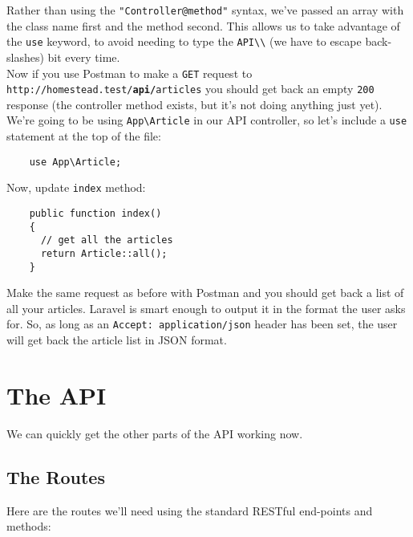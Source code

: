 Rather than using the \texttt{"Controller@method"} syntax, we've passed an array with the class name first and the method second. This allows us to take advantage of the \texttt{use} keyword, to avoid needing to type the \texttt{API\textbackslash\textbackslash} (we have to escape back-slashes) bit every time.
\\

Now if you use Postman to make a \texttt{GET} request to \texttt{http://homestead.test/\textbf{api/}articles} you should get back an empty \texttt{200} response (the controller method exists, but it's not doing anything just yet).
\\

We're going to be using \texttt{App\textbackslash{}Article} in our API controller, so let's include a \texttt{use} statement at the top of the file:

\begin{verbatim}
    use App\Article;
\end{verbatim}

Now, update \texttt{index} method:

\begin{verbatim}
    public function index()
    {
      // get all the articles
      return Article::all();
    }
\end{verbatim}

Make the same request as before with Postman and you should get back a list of all your articles. Laravel is smart enough to output it in the format the user asks for. So, as long as an \texttt{Accept: application/json} header has been set, the user will get back the article list in JSON format.


\section{The API}

We can quickly get the other parts of the API working now.

\subsection{The Routes}

Here are the routes we'll need using the standard RESTful end-points and methods:

